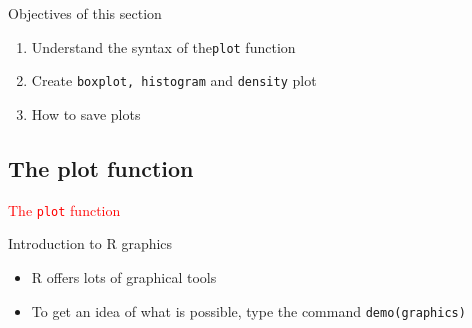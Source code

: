 \documentclass[11pt]{beamer}\usepackage[]{graphicx}\usepackage[]{color}
\newcommand{\code}[1]{\texttt{#1}}
\begin{document}
\begin{frame}[plain]
\hspace*{-1.0cm}\parbox[t]{\textwidth}{
\begin{block}{Objectives of this section}
\begin{enumerate}
\item Understand the syntax of the\code{plot} function
\item Create \code{boxplot, histogram} and \code{density} plot
\item How to save plots
\end{enumerate}
\end{block}
}
\end{frame}



\subsection{The plot function}

\begin{frame}
 \begin{center}
  \Huge{\textcolor{red}{The \code{plot} function}}
 \end{center}
\end{frame}



\begin{frame}[fragile]{Introduction to R graphics}
\begin{itemize}
  \setlength\itemsep{2em}
  \item R offers lots of graphical tools 
  \item To get an idea of what is possible, type the command \code{demo(graphics)} 
\end{itemize}
\end{frame}
\end{document}
